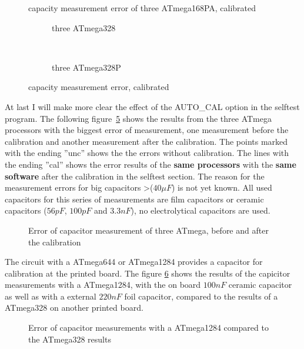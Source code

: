 \begin{figure}[H]
\centering

\caption{capacity measurement error of three ATmega168PA, calibrated}
\label{fig:mega168PAcal}
\end{figure}

\begin{figure}[H]
  \begin{subfigure}[b]{9cm}
    \centering
    \resizebox{9cm}{!}{}
    \caption{three ATmega328}
    \label{fig:mega328cal}
  \end{subfigure}
  ~
  \begin{subfigure}[b]{9cm}
    \centering
    \resizebox{9cm}{!}{}
    \caption{three ATmega328P}
    \label{fig:mega328Pcal}
  \end{subfigure}
  \caption{capacity measurement error, calibrated}
\end{figure}

At last I will make more clear the effect of the AUTO\_CAL option in the selftest program.
The following figure~\ref{fig:MegaAuto} shows the results from the three ATmega processors
with the biggest error of measurement, one measurement before the calibration and another
measurement after the calibration.
The points marked with the ending ''unc'' shows the the errors without calibration.
The lines with the ending ''cal'' shows the error results of the {\bf same processors} 
with the {\bf same software} after the calibration in the selftest section.
The reason for the measurement errors for big capacitors \textgreater(\(40\mu F\)) is
not yet known. All used capacitors for this series of measurements are film capacitors or
ceramic capacitors (\(56pF\), \(100pF\) and \(3.3nF\)), no electrolytical capacitors are used.

\begin{figure}[H]
\centering

\caption{Error of capacitor measurement of three ATmega, before and after the calibration}
\label{fig:MegaAuto}
\end{figure}

The circuit with a ATmega644 or ATmega1284 provides a capacitor for calibration at the printed board.
The figure \ref{fig:Mega1284} shows the results of the capicitor measurements with a ATmega1284,
with the on board \(100nF\) ceramic capacitor as well as with a external \(220nF\) foil capacitor, compared
to the results of a ATmega328 on another printed board.

\begin{figure}[H]
\centering

\caption{Error of capacitor measurements with a ATmega1284 compared to the ATmega328 results}
\label{fig:Mega1284}
\end{figure}

